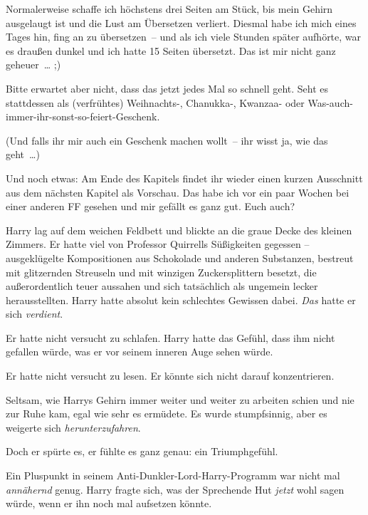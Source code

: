 

\hypertarget{der-satz-von-bayes}{%

Normalerweise schaffe ich höchstens drei Seiten am Stück, bis mein Gehirn ausgelaugt ist und die Lust am Übersetzen verliert. Diesmal habe ich mich eines Tages hin, fing an zu übersetzen~-- und als ich viele Stunden später aufhörte, war es draußen dunkel und ich hatte 15 Seiten übersetzt. Das ist mir nicht ganz geheuer~… ;)

Bitte erwartet aber nicht, dass das jetzt jedes Mal so schnell geht. Seht es stattdessen als (verfrühtes) Weihnachts-, Chanukka-, Kwanzaa- oder Was-auch-immer-ihr-sonst-so-feiert-Geschenk.

(Und falls ihr mir auch ein Geschenk machen wollt~-- ihr wisst ja, wie das geht~…)

Und noch etwas: Am Ende des Kapitels findet ihr wieder einen kurzen Ausschnitt aus dem nächsten Kapitel als Vorschau. Das habe ich vor ein paar Wochen bei einer anderen FF gesehen und mir gefällt es ganz gut. Euch auch?

\later

Harry lag auf dem weichen Feldbett und blickte an die graue Decke des kleinen Zimmers. Er hatte viel von Professor Quirrells Süßigkeiten gegessen -- ausgeklügelte Kompositionen aus Schokolade und anderen Substanzen, bestreut mit glitzernden Streuseln und mit winzigen Zuckersplittern besetzt, die außerordentlich teuer aussahen und sich tatsächlich als ungemein lecker herausstellten. Harry hatte absolut kein schlechtes Gewissen dabei. \emph{Das} hatte er sich \emph{verdient}.

Er hatte nicht versucht zu schlafen. Harry hatte das Gefühl, dass ihm nicht gefallen würde, was er vor seinem inneren Auge sehen würde.

Er hatte nicht versucht zu lesen. Er könnte sich nicht darauf konzentrieren.

Seltsam, wie Harrys Gehirn immer weiter und weiter zu arbeiten schien und nie zur Ruhe kam, egal wie sehr es ermüdete. Es wurde stumpfsinnig, aber es weigerte sich \emph{herunterzufahren}.

Doch er spürte es, er fühlte es ganz genau: ein Triumphgefühl.

Ein Pluspunkt in seinem Anti-Dunkler-Lord-Harry-Programm war nicht mal \emph{annähernd} genug. Harry fragte sich, was der Sprechende Hut \emph{jetzt} wohl sagen würde, wenn er ihn noch mal aufsetzen könnte.

}
